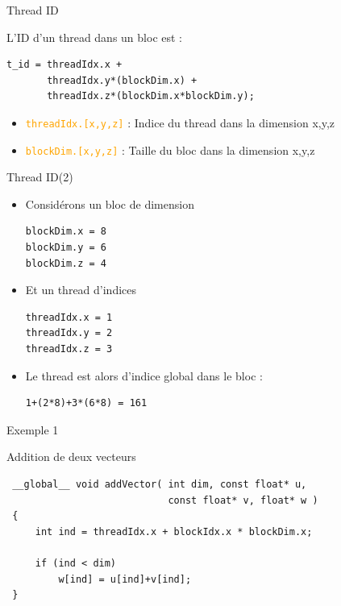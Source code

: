 \documentclass[handout,francais]{beamer}
\begin{document}
\begin{frame}[containsverbatim]{Thread ID}

L'ID d'un thread dans un bloc est :
\begin{lstlisting}
t_id = threadIdx.x + 
       threadIdx.y*(blockDim.x) + 
       threadIdx.z*(blockDim.x*blockDim.y);
\end{lstlisting}

\begin{itemize}
\item \textcolor{orange}{\texttt{threadIdx.[x,y,z]}} : Indice du thread dans la dimension x,y,z
\item \textcolor{orange}{\texttt{blockDim.[x,y,z]}}  : Taille du bloc dans la dimension x,y,z
\end{itemize}
\end{frame}

\begin{frame}[containsverbatim]{Thread ID(2)}
\begin{itemize}
\item Considérons un bloc de dimension
\begin{lstlisting}
blockDim.x = 8
blockDim.y = 6
blockDim.z = 4
\end{lstlisting}
\item Et un thread d'indices
\begin{lstlisting}
threadIdx.x = 1
threadIdx.y = 2
threadIdx.z = 3
\end{lstlisting}
\item Le thread est alors d'indice global dans le bloc :
\begin{lstlisting}
1+(2*8)+3*(6*8) = 161
\end{lstlisting}
\end{itemize}
\end{frame}

\begin{frame}[fragile]{Exemple 1}

\begin{block}{Addition de deux vecteurs}
 \begin{lstlisting}
 __global__ void addVector( int dim, const float* u, 
                            const float* v, float* w )
 {
     int ind = threadIdx.x + blockIdx.x * blockDim.x;
     
     if (ind < dim)
         w[ind] = u[ind]+v[ind];
 }
 \end{lstlisting}
\end{block}

\end{frame}
\end{document}
